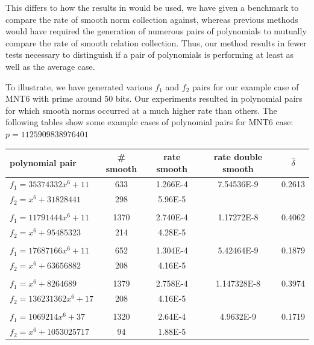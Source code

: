 \documentclass[a4paper, 10pt, envcountsect, runningheads]{article}
\numberwithin{figure}{section}
\numberwithin{equation}{section}
\begin{document}
This differs to how the results in \cite{zajac} would be used, we have given a benchmark to compare the rate of smooth norm collection against, whereas previous methods would have required the generation of numerous pairs of polynomials to mutually compare the rate of smooth relation collection. Thus, our method results in fewer tests necessary to distinguish if a pair of polynomials is performing at least as well as the average case.

To illustrate, we have generated various $f_1$ and $f_2$ pairs for our example case of MNT6 with prime around 50 bits. Our experiments resulted in polynomial pairs for which smooth norms occurred at a much higher rate than others. The following tables show some example cases of polynomial pairs for MNT6 case:\\

$p=1125909838976401$
\begin{center}
\begin{tabular}{l|cccc}
polynomial pair & \# smooth & rate smooth & rate double smooth & $\hat{\delta}$\\
\hline
$f_1=35374332x^6+11$ &633&1.266E-4&7.54536E-9&0.2613\\
$f_2=x^6+31828441$ &298&5.96E-5&&\\
&&&&\\
$f_1=11791444x^6+11$ &1370&2.740E-4&1.17272E-8&0.4062\\
$f_2=x^6+95485323$ &214&4.28E-5&&\\
&&&&\\
$f_1=17687166x^6+11$ &652&1.304E-4&5.42464E-9&0.1879\\
$f_2=x^6+63656882$ &208&4.16E-5&&\\
&&&&\\
$f_1=x^6+8264689$ &1379&2.758E-4&1.147328E-8&0.3974\\
$f_2=136231362x^6+17$ &208&4.16E-5&&\\
&&&&\\
$f_1=1069214x^6+37$ &1320&2.64E-4&4.9632E-9&0.1719\\
$f_2=x^6+1053025717$ &94&1.88E-5&&
\end{tabular}
\end{center}
\vspace{0.5cm}
\end{document}
